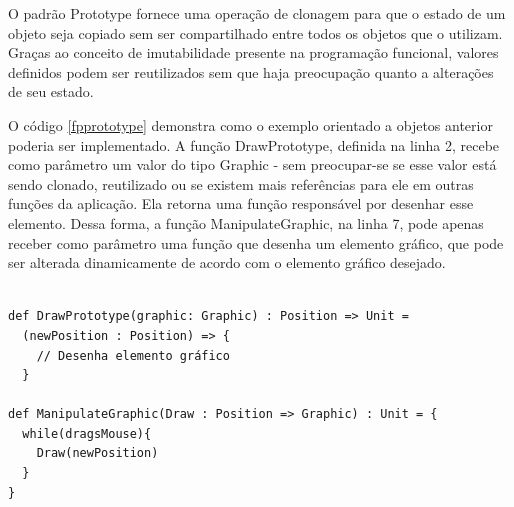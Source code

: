 O padrão Prototype fornece uma operação de 
clonagem para que o estado de um objeto seja 
copiado sem ser compartilhado entre todos 
os objetos que o utilizam. Graças ao conceito 
de imutabilidade presente na programação 
funcional, valores definidos podem 
ser reutilizados sem que haja preocupação 
quanto a alterações de seu estado.

O código \ref{fpprototype} demonstra como o 
exemplo orientado a objetos anterior poderia 
ser implementado. A função DrawPrototype, 
definida na linha 2, recebe como parâmetro um 
valor do tipo Graphic - sem preocupar-se se 
esse valor está sendo clonado, reutilizado ou 
se existem mais referências para ele em outras 
funções da aplicação. Ela retorna uma função 
responsável por desenhar esse elemento. Dessa 
forma, a função ManipulateGraphic, na linha 
7, pode apenas receber como parâmetro uma função 
que desenha um elemento gráfico, que pode ser 
alterada dinamicamente de acordo com o elemento 
gráfico desejado.

\begin{lstlisting}[caption={Prototype Funcional},label=fpprototype]
    
def DrawPrototype(graphic: Graphic) : Position => Unit =
  (newPosition : Position) => {
    // Desenha elemento gráfico
  }

def ManipulateGraphic(Draw : Position => Graphic) : Unit = {
  while(dragsMouse){
    Draw(newPosition)
  }
}
    
\end{lstlisting}